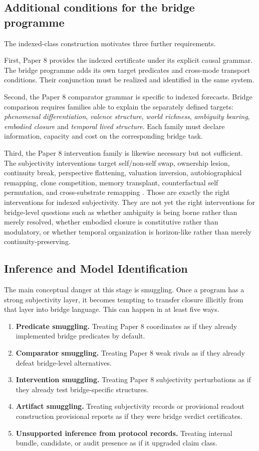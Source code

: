 \documentclass[11pt,a4paper]{article}
\theoremstyle{definition}
\begin{document}
\subsection{Additional conditions for the bridge programme}
The indexed-class construction motivates three further requirements.

First, Paper 8 provides the indexed certificate under its explicit causal grammar. The bridge programme adds its own target predicates and cross-mode transport conditions. Their conjunction must be realized and identified in the same system.


Second, the Paper 8 comparator grammar is specific to indexed forecasts. Bridge comparison requires families able to explain the separately defined targets: \emph{phenomenal differentiation}, \emph{valence structure}, \emph{world richness}, \emph{ambiguity bearing}, \emph{embodied closure} and \emph{temporal lived structure}. Each family must declare information, capacity and cost on the corresponding bridge task.

Third, the Paper 8 intervention family is likewise necessary but not sufficient. The subjectivity interventions target self/non-self swap, ownership lesion, continuity break, perspective flattening, valuation inversion, autobiographical remapping, clone competition, memory transplant, counterfactual self permutation, and cross-substrate remapping \cite{paper8}. Those are exactly the right interventions for indexed subjectivity. They are not yet the right interventions for bridge-level questions such as whether ambiguity is being borne rather than merely resolved, whether embodied closure is constitutive rather than modulatory, or whether temporal organization is horizon-like rather than merely continuity-preserving.

\subsection{Inference and Model Identification}
The main conceptual danger at this stage is smuggling. Once a program has a strong subjectivity layer, it becomes tempting to transfer closure illicitly from that layer into bridge language. This can happen in at least five ways.
\begin{enumerate}[leftmargin=1.5em]
\item \textbf{Predicate smuggling.} Treating Paper 8 coordinates as if they already implemented bridge predicates by default.
\item \textbf{Comparator smuggling.} Treating Paper 8 weak rivals as if they already defeat bridge-level alternatives.
\item \textbf{Intervention smuggling.} Treating Paper 8 subjectivity perturbations as if they already test bridge-specific structures.
\item \textbf{Artifact smuggling.} Treating subjectivity records or provisional readout construction provisional reports as if they were bridge verdict certificates.
\item \textbf{Unsupported inference from protocol records.} Treating internal bundle, candidate, or audit presence as if it upgraded claim class.
\end{enumerate}
\end{document}
